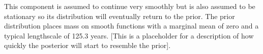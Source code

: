 This component is assumed to continue very smoothly but is also assumed to be stationary so its distribution will eventually return to the prior.
The prior distribution places mass on smooth functions with a marginal mean of zero and a typical lengthscale of 125.3 years.
[This is a placeholder for a description of how quickly the posterior will start to resemble the prior].